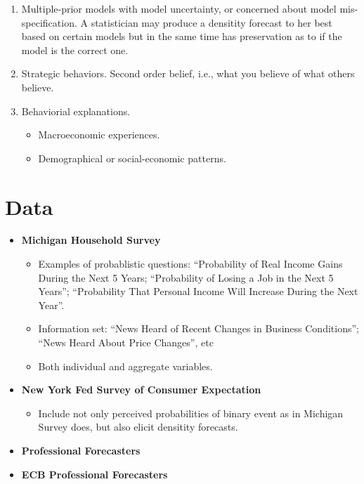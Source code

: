 \documentclass[]{article}
\begin{document}
\begin{enumerate}
\item Multiple-prior models with model uncertainty, or concerned about model mis-specification. \cite{hansen2001robust} A statistician may produce a densitity forecast to her best based on certain models but in the same time has preservation as to if the model is the correct one. 

\item Strategic behaviors. Second order belief, i.e., what you believe of what others believe. \cite{angeletos2009incomplete}

\item Behaviorial explanations. 
\begin{itemize}
	\item Macroeconomic experiences. \cite{malmendier2015learning}
	\item Demographical or social-economic patterns. 
	
\end{itemize}


\end{enumerate}

\section{Data}

\begin{itemize}
	
	\item \textbf{Michigan Household Survey}
	\begin{itemize}
		\item Examples of probablistic questions:
		``Probability of Real Income Gains During the Next 5 Years;
		``Probability of Losing a Job in the Next 5 Years'';
		``Probability That Personal Income Will Increase During the Next Year''.
		\item Information set: ``News Heard of Recent Changes in Business Conditions''; 
		``News Heard About Price Changes'', etc 
		\item Both individual and aggregate variables. 
	\end{itemize}
		\item \textbf{New York Fed Survey of Consumer Expectation}
	\begin{itemize}
			\item Include not only perceived probabilities of binary event as in Michigan Survey does, but also elicit densitity forecasts. 
	\end{itemize}
	\item \textbf{Professional Forecasters}
	\item \textbf{ECB Professional Forecasters}
\end{itemize}
\end{document}
